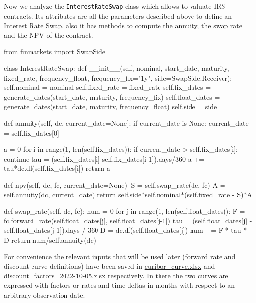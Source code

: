\begin{finmarkets}
Now we analyze the \texttt{InterestRateSwap} class which allows to valuate IRS contracts. Its attributes are all the parameters described above to define an Interest Rate Swap, also it has methods to compute the annuity, the swap rate and the NPV of the contract. 
\end{finmarkets}

\begin{ipython}
from finmarkets import SwapSide

class InterestRateSwap:
    def __init__(self, nominal, start_date, maturity,
                 fixed_rate, frequency_float, frequency_fix="1y", 
                 side=SwapSide.Receiver):
        self.nominal = nominal
        self.fixed_rate = fixed_rate
        self.fix_dates = generate_dates(start_date, maturity, frequency_fix)
        self.float_dates = generate_dates(start_date, maturity, frequency_float)
        self.side = side

    def annuity(self, dc, current_date=None):
        if current_date is None:
            current_date = self.fix_dates[0]

        a = 0
        for i in range(1, len(self.fix_dates)):
            if current_date > self.fix_dates[i]:
                continue
            tau = (self.fix_dates[i]-self.fix_dates[i-1]).days/360
            a += tau*dc.df(self.fix_dates[i])
        return a

    def npv(self, dc, fc, current_date=None):
        S = self.swap_rate(dc, fc)
        A = self.annuity(dc, current_date)
        return self.side*self.nominal*(self.fixed_rate - S)*A

    def swap_rate(self, dc, fc):
        num = 0
        for j in range(1, len(self.float_dates)):
            F = fc.forward_rate(self.float_dates[j], self.float_dates[j-1])
            tau = (self.float_dates[j] - self.float_dates[j-1]).days / 360
            D = dc.df(self.float_dates[j])
            num += F * tau * D
        return num/self.annuity(dc)
\end{ipython}

For convenience the relevant inputs that will be used later (forward rate and discount curve definitions) have been saved in \href{https://github.com/matteosan1/finance_course/raw/master/input_files/euribor_curve.xlsx}{euribor\_curve.xlsx} and \href{https://github.com/matteosan1/finance_course/raw/master/input_files/discount_factors_2022-10-05.xlsx}{discount\_factors\_2022-10-05.xlsx} respectively.
In there the two curves are expressed with factors or rates and time deltas in months with respect to an arbitrary observation date.


